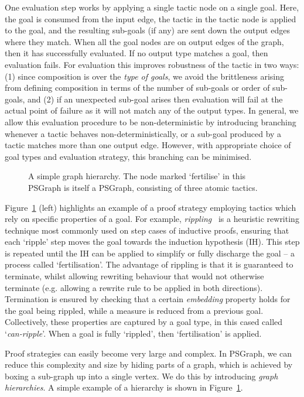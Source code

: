 \documentclass[submission,copyright,creativecommons]{eptcs}
\begin{document}
One evaluation step works by applying a single tactic node on a single goal. Here, the goal is consumed  from the input edge, the tactic in the tactic node is applied to the goal, and the resulting sub-goals (if any) are sent down the output edges where they match. When all the goal nodes are on output edges of the graph, then it has successfully evaluated.
If no output type matches a goal, then evaluation fails. For evaluation this improves robustness of the tactic in two ways: (1) since composition is over the \emph{type of goals}, we avoid the brittleness arising from defining composition in terms of the number of sub-goals or order of sub-goals, and (2) if an unexpected sub-goal arises then evaluation will fail at the actual point of failure as it will not match any of the output types. In general, we allow this evaluation procedure to be non-deterministic by introducing branching whenever a tactic behaves non-deterministically, or a sub-goal produced by a tactic matches more than one output edge. However, with appropriate choice of goal types and evaluation strategy, this branching can be minimised.

\begin{figure}[h]
  \centering
  \caption{A simple graph hierarchy. The node marked `fertilise' in this PSGraph is itself a PSGraph, consisting of three atomic tactics. \label{fig:unfold-ex}}
\end{figure}

Figure~\ref{fig:unfold-ex} (left) highlights an example of a proof strategy employing tactics which rely on specific properties of a goal. For example, \emph{rippling}~\cite{rippling-book} is a heuristic rewriting technique most commonly used on step cases of inductive proofs, ensuring that each `ripple' step moves the goal towards the induction hypothesis (IH). This step is repeated until the IH can be applied to simplify or fully discharge the goal -- a process called `fertilisation'. The advantage of rippling is that it is guaranteed to terminate, whilst allowing rewriting behaviour that would not otherwise terminate (e.g. allowing a rewrite rule to be applied in both directions). Termination is ensured by checking that a certain \emph{embedding} property holds for the goal being rippled, while a measure is reduced from a previous goal. Collectively, these properties are captured by a goal type, in this cased called `\textit{can-ripple}'. When a goal is fully `rippled', then  `fertilisation' is applied.

Proof strategies can easily become very large and complex. In PSGraph, we can
reduce this complexity and size by hiding parts of a graph, which is achieved by
boxing a sub-graph up into a single vertex. We do this by introducing \textit{graph hierarchies}. A simple example of a hierarchy is shown in Figure~\ref{fig:unfold-ex}.
\end{document}
